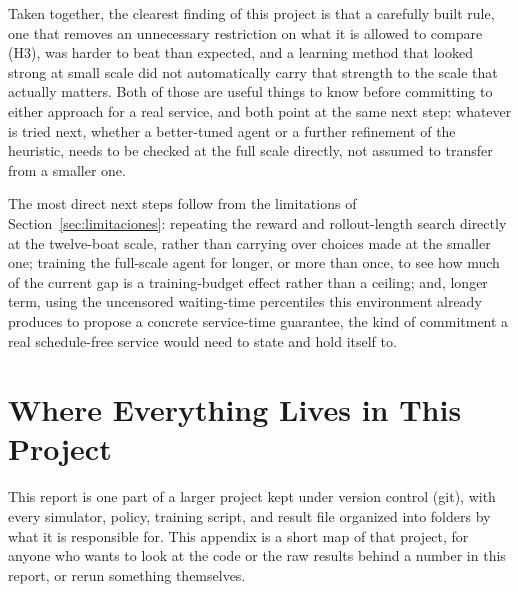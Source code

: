 \documentclass[11pt,a4paper]{article}
\begin{document}
Taken together, the clearest finding of this project is that a carefully built rule, one that removes an unnecessary restriction on what it is allowed to compare (H3), was harder to beat than expected, and a learning method that looked strong at small scale did not automatically carry that strength to the scale that actually matters. Both of those are useful things to know before committing to either approach for a real service, and both point at the same next step: whatever is tried next, whether a better-tuned agent or a further refinement of the heuristic, needs to be checked at the full scale directly, not assumed to transfer from a smaller one.

The most direct next steps follow from the limitations of Section~\ref{sec:limitaciones}: repeating the reward and rollout-length search directly at the twelve-boat scale, rather than carrying over choices made at the smaller one; training the full-scale agent for longer, or more than once, to see how much of the current gap is a training-budget effect rather than a ceiling; and, longer term, using the uncensored waiting-time percentiles this environment already produces to propose a concrete service-time guarantee, the kind of commitment a real schedule-free service would need to state and hold itself to.

\appendix
\section{Where Everything Lives in This Project}
\label{sec:apendice-repo}
\sloppy

This report is one part of a larger project kept under version control (git), with every simulator, policy, training script, and result file organized into folders by what it is responsible for. This appendix is a short map of that project, for anyone who wants to look at the code or the raw results behind a number in this report, or rerun something themselves.
\end{document}
